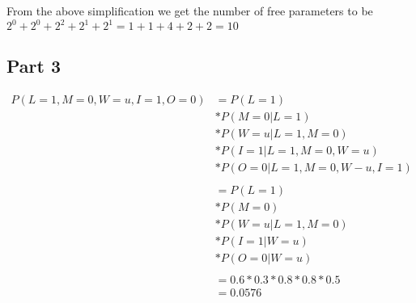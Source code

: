 \documentclass[a4paper, 12pt]{article}
\begin{document}
			From the above simplification we get the number of free parameters to be $2^0 + 2^0 + 2^2 + 2^1 + 2^1 = 1 + 1 + 4 + 2 + 2 = 10$
			
		\subsection{Part 3}
			\begin{equation*}
				\begin{split}
					P(L=1,M=0,W=u,I=1,O=0) & = P(L=1)
					\\
					& * P(M=0|L=1)
					\\
					& * P(W=u|L=1,M=0)
					\\
					& * P(I=1|L=1,M=0,W=u)
					\\
					& * P(O=0|L=1,M=0,W-u,I=1)
					\\\\
					& = P(L=1)
					\\
					& * P(M=0)
					\\
					& * P(W=u|L=1,M=0)
					\\
					& * P(I=1|W=u)
					\\
					& * P(O=0|W=u)
					\\\\
					& = 0.6 * 0.3 * 0.8 * 0.8 * 0.5
					\\
					& = 0.0576
				\end{split}
			\end{equation*}
			
\end{document}
